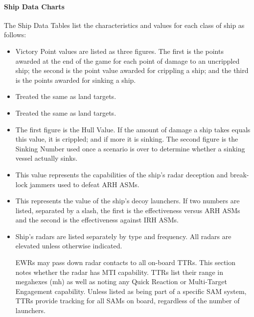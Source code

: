 \paragraph{Ship Data Charts}
The Ship Data Tables list the characteristics and values for each class of ship as follows: 

\begin{itemize}

    \item {} Victory Point values are listed as three figures.  The first is the points awarded at the end of the game for each point of damage to an uncrippled ship; the second is the point value awarded for crippling a ship; and the third is the points awarded for sinking a ship.

    \item {} Treated the same as land targets.

    \item {} Treated the same as land targets.
    
    \item {} The first figure is the Hull Value.  If the amount of damage a ship takes equals this value, it is crippled; and if more it is sinking. The second figure is the Sinking Number used once a scenario is over to determine whether a sinking vessel actually sinks.

    \item {} This value represents the capabilities of the ship's radar deception and break-lock jammers used to defeat ARH ASMs.

    \item {} This represents the value of the ship's decoy launchers.  If two numbers are listed, separated by a slash, the first is the effectiveness versus ARH ASMs and the second is the effectiveness against IRH ASMs.

    \item {} Ship's radars are listed separately by type and frequency. All radars are elevated unless otherwise indicated.

    EWRs may pass down radar contacts to all on-board TTRs.  This section notes whether the radar has MTI capability. TTRs list their range in megahexes (mh) as well as noting any Quick Reaction or Multi-Target Engagement capability.  Unless listed as being part of a specific SAM system, TTRs provide tracking for all SAMs on board, regardless of the number of launchers.


\end{itemize}

